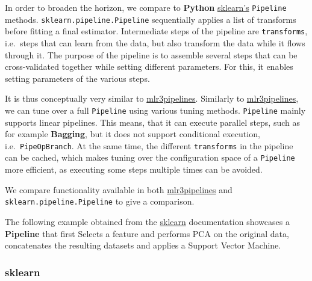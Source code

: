 \documentclass[
]{scrbook}
\begin{document}
In order to broaden the horizon, we compare to \textbf{Python} \href{https://scikit-learn.org/stable/}{sklearn's} \texttt{Pipeline} methods.
\texttt{sklearn.pipeline.Pipeline} sequentially applies a list of transforms before fitting a final estimator.
Intermediate steps of the pipeline are \texttt{transforms}, i.e.~steps that can learn from the data, but also transform the data while it flows through it.
The purpose of the pipeline is to assemble several steps that can be cross-validated together while setting different parameters.
For this, it enables setting parameters of the various steps.

It is thus conceptually very similar to \href{https://cran.r-project.org/package=mlr3pipelines}{mlr3pipelines}.
Similarly to \href{https://cran.r-project.org/package=mlr3pipelines}{mlr3pipelines}, we can tune over a full \texttt{Pipeline} using various tuning methods.
\texttt{Pipeline} mainly supports linear pipelines.
This means, that it can execute parallel steps, such as for example \textbf{Bagging}, but it does not support conditional execution, i.e.~\texttt{PipeOpBranch}.
At the same time, the different \texttt{transforms} in the pipeline can be cached, which makes tuning over the configuration space of a \texttt{Pipeline} more efficient, as executing some steps multiple times can be avoided.

We compare functionality available in both \href{https://cran.r-project.org/package=mlr3pipelines}{mlr3pipelines} and \texttt{sklearn.pipeline.Pipeline} to give a comparison.

The following example obtained from the \href{https://scikit-learn.org/stable/}{sklearn} documentation showcases a \textbf{Pipeline} that first Selects a feature and performs PCA on the original data, concatenates the resulting datasets and applies a Support Vector Machine.

\hypertarget{sklearn}{%
\subsubsection{sklearn}\label{sklearn}}
\end{document}
